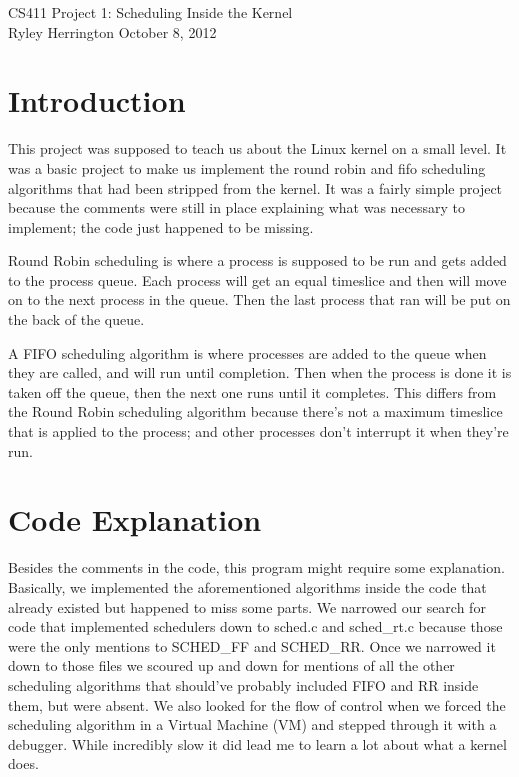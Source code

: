\documentclass[letterpaper,10pt]{article}
\begin{document}
\begin{center}
{\large CS411 Project 1: Scheduling Inside the Kernel } \\ %
Ryley Herrington
October 8, 2012
\end{center}

\section{Introduction}
This project was supposed to teach us about the Linux kernel on a small level. It was a basic project to make us implement the round robin and fifo scheduling algorithms that had been stripped from the kernel. It was a fairly simple project because the comments were still in place explaining what was necessary to implement; the code just happened to be missing.   

Round Robin scheduling is where a process is supposed to be run and gets added to the process queue. Each process will get an equal timeslice and then will move on to the next process in the queue. Then the last process that ran will be put on the back of the queue. 

A FIFO scheduling algorithm is where processes are added to the queue when they are called, and will run until completion. Then when the process is done it is taken off the queue, then the next one runs until it completes. This differs from the Round Robin scheduling algorithm because there's not a maximum timeslice that is applied to the process; and other processes don't interrupt it when they're run.

\section{Code Explanation}
Besides the comments in the code, this program might require some explanation. Basically, we implemented the aforementioned algorithms inside the code that already existed but happened to miss some parts. We narrowed our search for code that implemented schedulers down to sched.c and sched\_rt.c because those were the only mentions to SCHED\_FF and SCHED\_RR. Once we narrowed it down to those files we scoured up and down for mentions of all the other scheduling algorithms that should've probably included FIFO and RR inside them, but were absent. We also looked for the flow of control when we forced the scheduling algorithm in a Virtual Machine (VM) and stepped through it with a debugger. While incredibly slow it did lead me to learn a lot about what a kernel does. 
\end{document}
